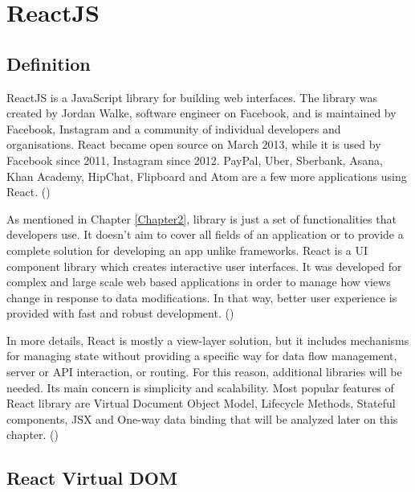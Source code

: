 
\chapter{ReactJS} %

\label{Chapter3} %

\section{Definition}
ReactJS is a JavaScript library for building web interfaces. The library was created by Jordan Walke, software engineer on Facebook, and is maintained by Facebook, Instagram and a community of individual developers and organisations. React became open source on March 2013, while it is used by Facebook since 2011, Instagram since 2012. PayPal, Uber, Sberbank, Asana, Khan Academy, HipChat, Flipboard and Atom are a few more applications using React. (\cite{reactQuickly}) \par 

As mentioned in Chapter \ref{Chapter2}, library is just a set of functionalities that developers use. It doesn't aim to cover all fields of an application or to provide a complete solution for developing an app unlike frameworks. React is a UI component library which creates interactive user interfaces. It was developed for complex and large scale web based applications in order to manage how views change in response to data modifications. In that way, better user experience is provided with fast and robust development. (\cite{reactQuickly})  \par

In more details, React is mostly a view-layer solution, but it includes mechanisms for managing state without providing a specific way for data flow management, server or API interaction, or routing. For this reason, additional libraries will be needed. Its main concern is simplicity and scalability. Most popular features of React library are Virtual Document Object Model, Lifecycle Methods, Stateful components, JSX and One-way data binding that will be analyzed later on this chapter. (\cite{Reference13}) \par

\section{React Virtual DOM}

